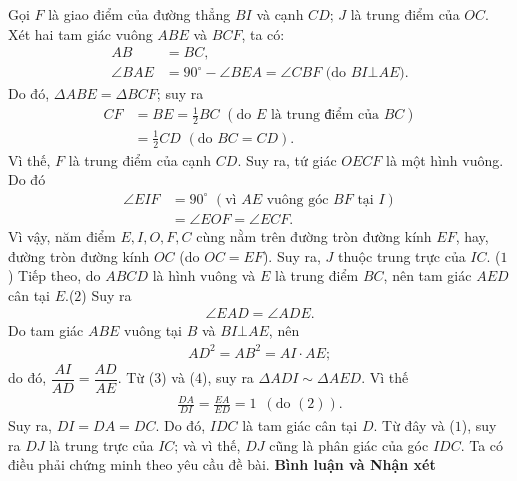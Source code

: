 \begin{multicols}{2}
\begin{center}
	\end{center}
	Gọi $F$ là giao điểm của đường thẳng $BI$ và cạnh $CD$; $J$ là trung điểm của $OC$.
	\vskip 0.05cm
	Xét hai tam giác vuông $ABE$ và $BCF$, ta có:
	\begin{align*}
		AB &= BC,\\
		\angle BAE \!&=\! {90^{\circ}} \!-\! \angle BEA \!=\! \angle CBF \,\, \text{(do $BI \bot AE$)}.
	\end{align*}
	Do đó, $\Delta ABE = \Delta BCF$; suy ra
	\begin{align*}
		CF &\!=\! BE \!=\! \frac{1}{2} BC \,\,(\text{do $E$ là trung điểm của $BC$})\\
		&\!=\! \frac{1}{2}CD \,\,(\text{do $BC = CD$}).
	\end{align*}
	Vì thế, $F$ là trung điểm của cạnh $CD$. Suy ra, tứ giác $OECF$ là một hình vuông. Do đó
	\begin{align*}
		\angle EIF &= 90^\circ \,\,(\text{vì $AE$ vuông góc $BF$ tại $I$})\\
		&= \angle EOF = \angle ECF.
	\end{align*}
	Vì vậy, năm điểm $E, I, O, F, C$ cùng nằm trên đường tròn đường kính $EF$, hay, đường tròn đường kính $OC$ (do $OC = EF$). Suy ra, $J$ thuộc trung trực của $IC$. \hfill ($1$)
	\vskip 0.05cm
	Tiếp theo, do $ABCD$ là hình vuông và $E$ là trung điểm $BC$, nên tam giác $AED$ cân \linebreak tại $E$.\hfill ($2$)
	\vskip 0.05cm
	Suy ra
	\begin{align*}
		\angle EAD = \angle ADE. \tag{$3$}
	\end{align*}
	Do tam giác $ABE$ vuông tại $B$ và $BI \bot AE$, nên
	\begin{align*}
		A{D^2} = A{B^2} = AI \cdot AE;
	\end{align*}
	do đó, $\dfrac{{AI}}{{AD}} = \dfrac{{AD}}{{AE}}$.
	\vskip 0.05cm
	Từ ($3$) và ($4$), suy ra $\Delta ADI \sim \Delta AED$. Vì thế
	\begin{align*}
		\frac{{DA}}{{DI}} = \frac{{EA}}{{ED}} = 1\,\,\,({\text{do }}(2)).
	\end{align*}
	Suy ra, $DI = DA = DC$. Do đó, $IDC$ là tam giác cân tại $D$. Từ đây và ($1$), suy ra $DJ$ là trung trực của $IC$; và vì thế, $DJ$ cũng là phân giác của góc $IDC$. Ta có điều phải chứng minh theo yêu cầu đề bài.
	\vskip 0.05cm
	\textbf{\color{thachthuctoanhoc}Bình luận và Nhận xét}

\end{multicols}
